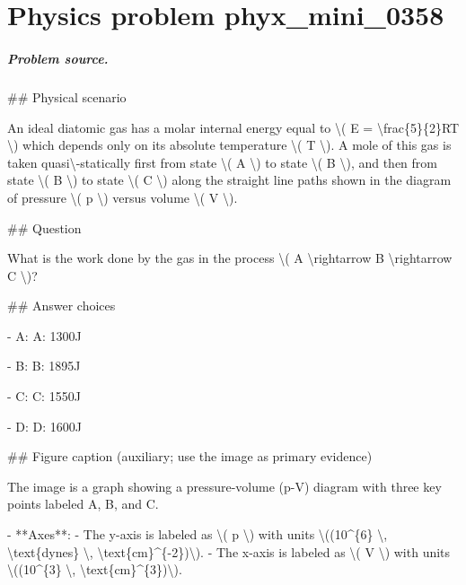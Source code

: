 
\chapter{Physics problem phyx\_mini\_0358}
\label{ch:PhyXMiniProblems_problem_phyx_mini_0358}

\paragraph{Problem source.}
\#\# Physical scenario

An ideal diatomic gas has a molar internal energy equal to \textbackslash{}( E = \textbackslash{}frac\{5\}\{2\}RT \textbackslash{}) which depends only on its absolute temperature \textbackslash{}( T \textbackslash{}). A mole of this gas is taken quasi\textbackslash{}-statically first from state \textbackslash{}( A \textbackslash{}) to state \textbackslash{}( B \textbackslash{}), and then from state \textbackslash{}( B \textbackslash{}) to state \textbackslash{}( C \textbackslash{}) along the straight line paths shown in the diagram of pressure \textbackslash{}( p \textbackslash{}) versus volume \textbackslash{}( V \textbackslash{}).

\#\# Question

What is the work done by the gas in the process \textbackslash{}( A \textbackslash{}rightarrow B \textbackslash{}rightarrow C \textbackslash{})?

\#\# Answer choices

- A: A: 1300J

- B: B: 1895J

- C: C: 1550J

- D: D: 1600J

\#\# Figure caption (auxiliary; use the image as primary evidence)

The image is a graph showing a pressure-volume (p-V) diagram with three key points labeled A, B, and C. 

- **Axes**: 
  - The y-axis is labeled as \textbackslash{}( p \textbackslash{}) with units \textbackslash{}((10\textasciicircum{}\{6\} \textbackslash{}, \textbackslash{}text\{dynes\} \textbackslash{}, \textbackslash{}text\{cm\}\textasciicircum{}\{-2\})\textbackslash{}).
  - The x-axis is labeled as \textbackslash{}( V \textbackslash{}) with units \textbackslash{}((10\textasciicircum{}\{3\} \textbackslash{}, \textbackslash{}text\{cm\}\textasciicircum{}\{3\})\textbackslash{}).

